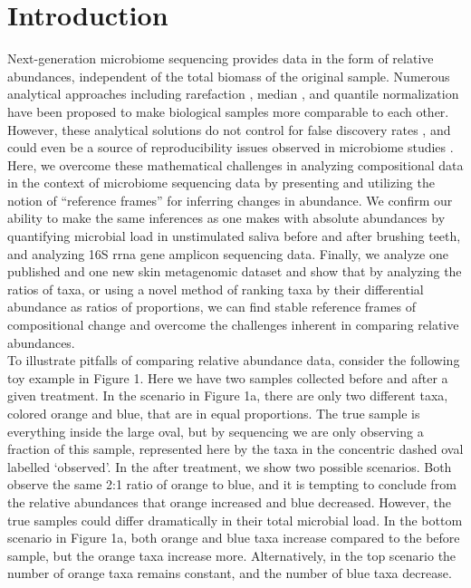 \section*{Introduction}
Next-generation microbiome sequencing provides data in the form of relative abundances,
independent of the total biomass of the original sample. Numerous analytical approaches
including rarefaction \cite{Weiss2015-gn}, median \cite{Love2014-sn}, and quantile normalization
\cite{Paulson2013-mm} have been proposed to make biological samples more comparable to each other.
However, these analytical solutions do not control for false discovery rates \cite{Russel2018-na},
\cite{Hawinkel2017-ax} and could even be a source of reproducibility issues observed in microbiome
studies \cite{Gloor2015-zq}. Here, we overcome these mathematical challenges in analyzing
compositional data in the context of microbiome sequencing data by presenting and utilizing
the notion of “reference frames” for inferring changes in abundance. We confirm our ability
to make the same inferences as one makes with absolute abundances by quantifying microbial load
in unstimulated saliva before and after brushing teeth, and analyzing 16S \gls{rrna} gene amplicon sequencing
data.  Finally, we analyze one published and one new skin metagenomic dataset and show that by analyzing
the ratios of taxa, or using a novel method of ranking taxa by their differential abundance as ratios of
proportions, we can find stable reference frames of compositional change and overcome the challenges
inherent in comparing relative abundances.\\[5 mm]
%
To illustrate pitfalls of comparing relative abundance data, consider the following toy example
in Figure 1. Here we have two samples collected  before and after a given treatment.  In the
scenario in Figure 1a, there are only two different taxa, colored orange and blue, that are in
equal proportions. The true sample is everything inside the large oval, but by sequencing we are
only observing a fraction of this sample, represented here by the taxa in the concentric dashed
oval labelled ‘observed’.  In the after treatment, we show two possible scenarios. Both observe
the same 2:1 ratio of orange to blue, and it is tempting to conclude from the relative abundances
that orange increased and blue decreased.  However, the true samples could differ dramatically
in their total microbial load. In the bottom scenario in Figure 1a, both orange and blue taxa
increase compared to the before sample, but the orange taxa increase more. Alternatively, in the
top scenario the number of orange taxa remains constant, and the number of blue taxa decrease.

